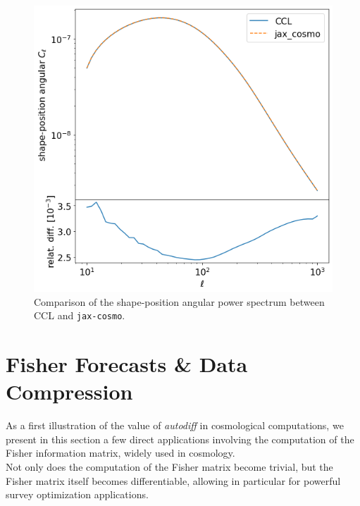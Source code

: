 \documentclass[twocolumn,twocolappendix,nofootinbib,iop]{openjournal}
\newcommand{\jaxcosmo}{\texttt{jax-cosmo}}
\begin{document}
\begin{figure}
    \centering
    \includegraphics[width=\columnwidth]{figures/comp_Cell_shape_pos.png}
    \caption{Comparison of the shape-position angular power spectrum between CCL and \jaxcosmo.} 
    \label{fig:Cell_comparison}
\end{figure}


\section{Fisher Forecasts \& Data Compression}
\label{sec-fisher-forecast}

As a first illustration of the value of \textit{autodiff} in cosmological computations, we present in this section a few direct applications involving the computation of the Fisher information matrix, widely used in cosmology. \\
Not only does the computation of the Fisher matrix become trivial, but the Fisher matrix itself becomes differentiable, allowing in particular for powerful survey optimization applications.

\end{document}
